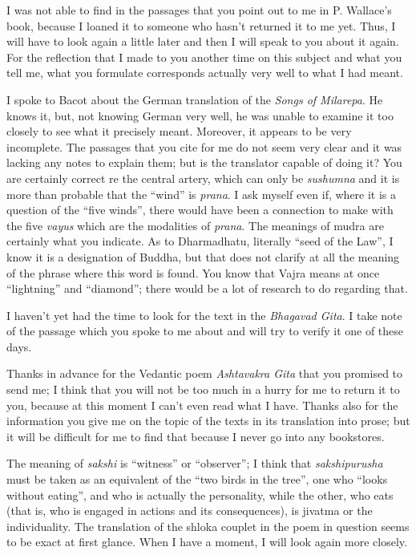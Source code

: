 I was not able to find in the passages that you point out to me in P. Wallace's book, because I loaned it to someone who hasn't returned it to me yet. Thus, I will have to look again a little later and then I will speak to you about it again. For the reflection that I made to you another time on this subject and what you tell me, what you formulate corresponds actually very well to what I had meant.

I spoke to Bacot about the German translation of the \emph{Songs of Milarepa}. He knows it, but, not knowing German very well, he was unable to examine it too closely to see what it precisely meant. Moreover, it appears to be very incomplete. The passages that you cite for me do not seem very clear and it was lacking any notes to explain them; but is the translator capable of doing it? You are certainly correct re the central artery, which can only be \emph{sushumna} and it is more than probable that the ``wind'' is \emph{prana}. I ask myself even if, where it is a question of the ``five winds'', there would have been a connection to make with the five \emph{vayus} which are the modalities of \emph{prana}. The meanings of mudra are certainly what you indicate. As to Dharmadhatu, literally ``seed of the Law'', I know it is a designation of Buddha, but that does not clarify at all the meaning of the phrase where this word is found. You know that Vajra means at once ``lightning'' and ``diamond''; there would be a lot of research to do regarding that.

I haven't yet had the time to look for the text in the \emph{Bhagavad Gita}. I take note of the passage which you spoke to me about and will try to verify it one of these days.

Thanks in advance for the Vedantic poem \emph{Ashtavakra Gita} that you promised to send me; I think that you will not be too much in a hurry for me to return it to you, because at this moment I can't even read what I have. Thanks also for the information you give me on the topic of the texts in its translation into prose; but it will be difficult for me to find that because I never go into any bookstores.

The meaning of \emph{sakshi} is ``witness'' or ``observer''; I think that \emph{sakshipurusha} must be taken as an equivalent of the ``two birds in the tree'', one who ``looks without eating'', and who is actually the personality, while the other, who eats (that is, who is engaged in actions and its consequences), is jivatma or the individuality. The translation of the shloka couplet in the poem in question seems to be exact at first glance. When I have a moment, I will look again more closely.

